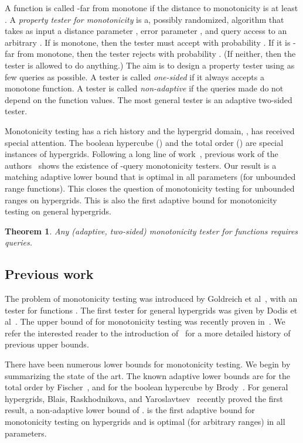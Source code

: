 \documentclass[11pt]{article}
\newtheorem{theorem}{Theorem}[section]
\begin{document}
A function is called -far from monotone if the distance to monotonicity is at least .
A \emph{property tester for monotonicity} is a, possibly randomized, algorithm that takes as input a distance parameter , error parameter , 
and query access to an arbitrary . If  is monotone, then the tester must accept with probability .
If it is -far from monotone, then the tester rejects with probability . (If neither, then the tester
is allowed to do anything.) The aim is to design a property tester using as few queries as possible.
A tester is called \emph{one-sided} if it always accepts a monotone function. A tester is called \emph{non-adaptive}
if the queries made do not depend on the function values. The most general tester is an adaptive two-sided tester.

Monotonicity testing has a rich history and the hypergrid domain, , has received special attention.
The boolean hypercube () and the total order () are special instances of hypergrids.
Following a long line of work~\cite{EKK+00, GGLRS00,DGLRRS99,LR01,FLNRRS02,AC04,E04,HK04,PRR04,ACCL04,BRW05,BBM11}, 
previous work of the authors~\cite{ChSe13} shows the existence of -query
monotonicity testers. Our result is a matching adaptive lower bound that is optimal in all parameters
(for unbounded range functions).
This closes the
question of monotonicity testing for unbounded ranges on hypergrids.
This is also the first adaptive bound for monotonicity testing on general hypergrids.

\begin{theorem} \label{thm:main}
Any (adaptive, two-sided) monotonicity tester for functions  requires  queries.
\end{theorem}

\subsection{Previous work} \label{sec:prev}

The problem of monotonicity testing was introduced by Goldreich et al~\cite{GGLRS00}, with an 
tester for functions . The first tester for general hypergrids was given
by Dodis et al~\cite{DGLRRS99}. The upper bound of  for monotonicity testing was recently proven
in~\cite{ChSe13}. We refer the interested reader to the introduction of~\cite{ChSe13} for a more detailed history of previous upper bounds.

There have been numerous lower bounds for monotonicity testing. We begin by summarizing the state of the art.
The known adaptive lower bounds are  for the total order  by Fischer~\cite{E04},
and  for the boolean hypercube  by Brody~\cite{Br13}. For general hypergrids,
Blais, Raskhodnikova, and Yaroslavtsev~\cite{BlJh+12} recently proved the first result, a non-adaptive lower bound of .
 is the first adaptive bound for monotonicity testing on hypergrids and is optimal (for arbitrary ranges) in all parameters.
\end{document}
